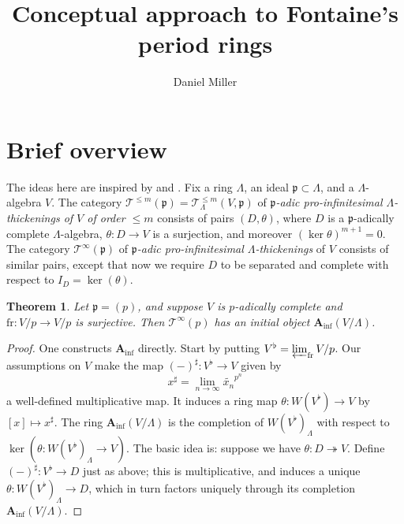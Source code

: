 \documentclass{article}
\title{Conceptual approach to Fontaine's period rings}
\author{Daniel Miller}
\newcommand{\cT}{\mathcal{T}}
\newcommand{\fp}{\mathfrak{p}}
\newcommand{\frobenius}{\mathrm{fr}}
\newcommand{\Ainf}{\mathbf{A}_\mathrm{inf}}
\newtheorem{theorem}{Theorem}
\begin{document}
\maketitle





\section{Brief overview}

The ideas here are inspired by \cite{fontaine-1994} and \cite{scholze-2012}. 
Fix a ring $\Lambda$, an ideal $\fp\subset \Lambda$, and a $\Lambda$-algebra 
$V$. The category $\cT^{\leqslant m}(\fp) = \cT_\Lambda^{\leqslant m}(V,\fp)$ 
of \emph{$\fp$-adic pro-infinitesimal $\Lambda$-thickenings of $V$ of order 
$\leqslant m$} consists of pairs $(D,\theta)$, where $D$ is a $\fp$-adically 
complete $\Lambda$-algebra, $\theta:D\to V$ is a surjection, and moreover 
$(\ker\theta)^{m+1}=0$. The category $\cT^\infty(\fp)$ of 
\emph{$\fp$-adic pro-infinitesimal $\Lambda$-thickenings} of $V$ consists of 
similar pairs, except that now we require $D$ to be separated and complete with 
respect to $I_D=\ker(\theta)$. 

\begin{theorem}
Let $\fp=(p)$, and suppose $V$ is $p$-adically complete and 
$\frobenius:V/p\to V/p$ is surjective. Then $\cT^\infty(p)$ has an initial 
object $\Ainf(V/\Lambda)$. 
\end{theorem}
\begin{proof}
One constructs $\Ainf$ directly. Start by putting 
$V^\flat = \varprojlim_\frobenius V/p$. Our assumptions on $V$ make the map 
$(-)^\sharp:V^\flat \to V$ given by 
\[
  x^\sharp = \lim_{n\to \infty} \widetilde{x_n}^{p^n} 
\]
a well-defined multiplicative map. It induces a ring map 
$\theta:W(V^\flat) \to V$ by $[x]\mapsto x^\sharp$. The ring 
$\Ainf(V/\Lambda)$ is the completion of 
$W(V^\flat)_\Lambda$ with respect to $\ker(\theta:W(V^\flat)_\Lambda\to V)$. 
The basic idea is: suppose we have $\theta:D\twoheadrightarrow V$. Define 
$(-)^\sharp:V^\flat\to D$ just as above; this is multiplicative, and induces 
a unique $\theta:W(V^\flat)_\Lambda\to D$, which in turn factors uniquely 
through its completion $\Ainf(V/\Lambda)$. 
\end{proof}
\end{document}
